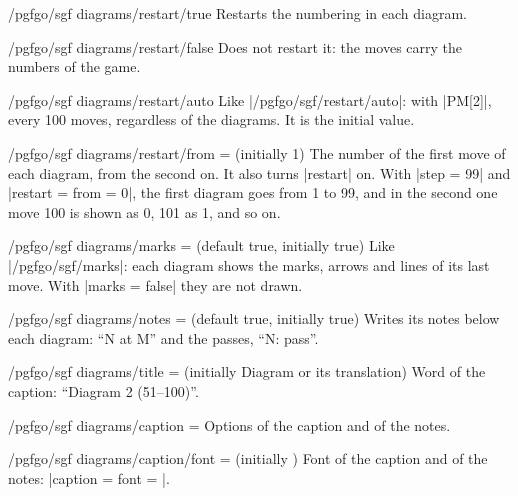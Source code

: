 
\begin{key}{/pgfgo/sgf diagrams/restart/true}
	Restarts the numbering in each diagram.
\end{key}

\begin{key}{/pgfgo/sgf diagrams/restart/false}
	Does not restart it: the moves carry the numbers of the game.
\end{key}

\begin{key}{/pgfgo/sgf diagrams/restart/auto}
	Like |/pgfgo/sgf/restart/auto|: with |PM[2]|, every 100 moves, regardless of the diagrams. It is the initial value.
\end{key}

\begin{key}{/pgfgo/sgf diagrams/restart/from =  (initially 1)}
	The number of the first move of each diagram, from the second on. It also turns |restart| on. With |step = 99| and |restart = {from = 0}|, the first diagram goes from 1 to 99, and in the second one move 100 is shown as 0, 101 as 1, and so on.
\end{key}

\begin{key}{/pgfgo/sgf diagrams/marks =  (default true, initially true)}
	Like |/pgfgo/sgf/marks|: each diagram shows the marks, arrows and lines of its last move. With |marks = false| they are not drawn.
\end{key}

\begin{key}{/pgfgo/sgf diagrams/notes =  (default true, initially true)}
	Writes its notes below each diagram: ``N at M'' and the passes, ``N: pass''.
\end{key}

\begin{key}{/pgfgo/sgf diagrams/title =  (initially Diagram or its translation)}
	Word of the caption: ``Diagram 2 (51--100)''.
\end{key}

\begin{key}{/pgfgo/sgf diagrams/caption = }
	Options of the caption and of the notes.
\end{key}

\begin{key}{/pgfgo/sgf diagrams/caption/font =  (initially \texttt{\string\small})}
	Font of the caption and of the notes: |caption = {font = \itshape}|.

	\begin{codeexample}
	\end{codeexample}

\end{key}

